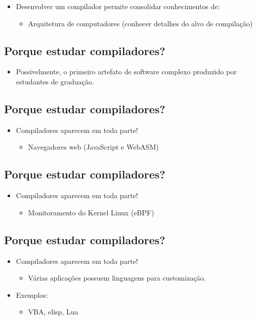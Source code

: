 \documentclass[11pt]{article}
\begin{document}
\begin{itemize}
\item Desenvolver um compilador permite consolidar conhecimentos de:
\begin{itemize}
\item Arquitetura de computadores (conhecer detalhes do alvo de compilação)
\end{itemize}
\end{itemize}
\subsection*{Porque estudar compiladores?}
\label{sec:orgd86e055}

\begin{itemize}
\item Possivelmente, o primeiro artefato de software complexo produzido por estudantes de graduação.
\end{itemize}
\subsection*{Porque estudar compiladores?}
\label{sec:orgb236f33}

\begin{itemize}
\item Compiladores aparecem em toda parte!
\begin{itemize}
\item Navegadores web (JavaScript e WebASM)
\end{itemize}
\end{itemize}
\subsection*{Porque estudar compiladores?}
\label{sec:org023ef13}

\begin{itemize}
\item Compiladores aparecem em toda parte!
\begin{itemize}
\item Monitoramento do Kernel Linux (eBPF)
\end{itemize}
\end{itemize}
\subsection*{Porque estudar compiladores?}
\label{sec:orgb51400d}

\begin{itemize}
\item Compiladores aparecem em toda parte!
\begin{itemize}
\item Várias aplicações possuem linguagens para customização.
\end{itemize}
\item Exemplos:
\begin{itemize}
\item VBA, elisp, Lua
\end{itemize}
\end{itemize}
\end{document}
